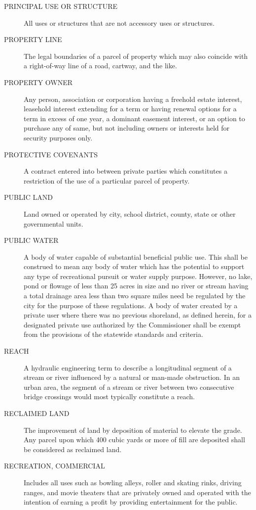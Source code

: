 \begin{description}
    \item[PRINCIPAL USE OR STRUCTURE] All uses or structures that are not accessory uses or structures.
    \item[PROPERTY LINE] The legal boundaries of a parcel of property which may also coincide with a right-of-way line of a road, cartway, and the like.
    \item[PROPERTY OWNER] Any person, association or corporation having a freehold estate interest, leasehold interest extending for a term or having renewal options for a term in excess of one year, a dominant easement interest, or an option to purchase any of same, but not including owners or interests held for security purposes only.
    \item[PROTECTIVE COVENANTS] A contract entered into between private parties which constitutes a restriction of the use of a particular parcel of property.
    \item[PUBLIC LAND] Land owned or operated by city, school district, county, state or other governmental units.
    \item[PUBLIC WATER] A body of water capable of substantial beneficial public use. This shall be construed to mean any body of water which has the potential to support any type of recreational pursuit or water supply purpose. However, no lake, pond or flowage of less than 25 acres in size and no river or stream having a total drainage area less than two square miles need be regulated by the city for the purpose of these regulations. A body of water created by a private user where there was no previous shoreland, as defined herein, for a designated private use authorized by the Commissioner shall be exempt from the provisions of the statewide standards and criteria.
    \item[REACH] A hydraulic engineering term to describe a longitudinal segment of a stream or river influenced by a natural or man-made obstruction. In an urban area, the segment of a stream or river between two consecutive bridge crossings would most typically constitute a reach.
    \item[RECLAIMED LAND] The improvement of land by deposition of material to elevate the grade.  Any parcel upon which 400 cubic yards or more of fill are deposited shall be considered as reclaimed land.
    \item[RECREATION, COMMERCIAL] Includes all uses such as bowling alleys, roller and skating rinks, driving ranges, and movie theaters that are privately owned and operated with the intention of earning a profit by providing entertainment for the public.

\end{description}
